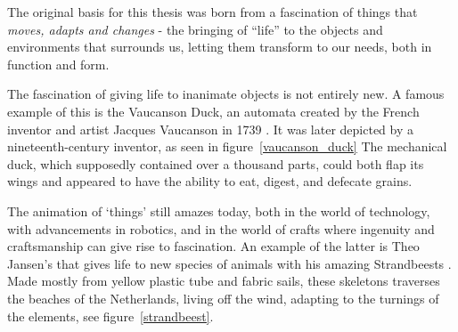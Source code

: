 The original basis for this thesis was born from a fascination of things that \emph{moves, adapts and changes} - the bringing of ``life'' to the objects and environments that surrounds us, letting them transform to our needs, both in function and form. 

The fascination of giving life to inanimate objects is not entirely new.
A famous example of this is the Vaucanson Duck, an automata created by the French inventor and artist Jacques Vaucanson in 1739 \citep{riskin2003defecating}.
It was later depicted by a nineteenth-century inventor, as seen in figure~\ref{vaucanson_duck} 
The mechanical duck, which supposedly contained over a thousand parts, could both flap its wings and appeared to have the ability to eat, digest, and defecate grains.

The animation of `things' still amazes today, both in the world of technology, with advancements in robotics, and in the world of crafts where ingenuity and craftsmanship can give rise to fascination.   
An example of the latter is Theo Jansen's that gives life to new species of animals with his amazing Strandbeests \cite{strandbeestJansen}.  
Made mostly from yellow plastic tube and fabric sails, these skeletons traverses the beaches of the Netherlands, living off the wind, adapting to the turnings of the elements, see figure~\ref{strandbeest}.

